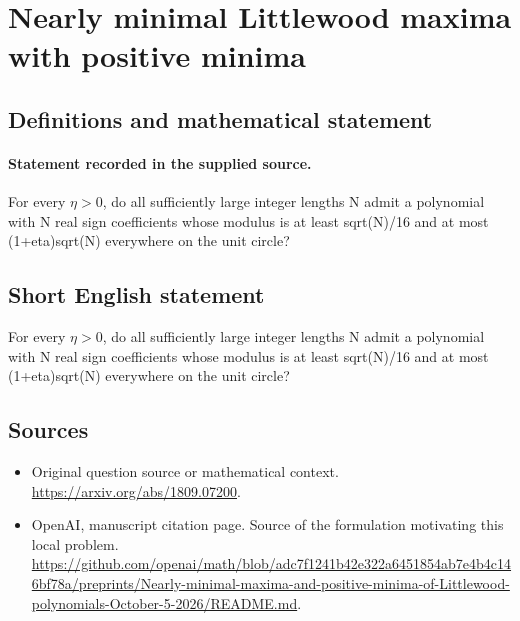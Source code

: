 \documentclass[11pt]{article}
\begin{document}
\section*{Nearly minimal Littlewood maxima with positive minima}\label{statement}
\subsection{Definitions and mathematical statement}
\paragraph{Statement recorded in the supplied source.}
For every $\eta >0$, do all sufficiently large integer lengths N admit a polynomial with N real sign coefficients whose modulus is at least sqrt(N)/16 and at most (1+eta)sqrt(N) everywhere on the unit circle?
\subsection{Short English statement}
For every $\eta >0$, do all sufficiently large integer lengths N admit a polynomial with N real sign coefficients whose modulus is at least sqrt(N)/16 and at most (1+eta)sqrt(N) everywhere on the unit circle?
\subsection{Sources}
\begin{itemize}
\item[S1] Original question source or mathematical context.
\url{https://arxiv.org/abs/1809.07200}.
\item[S2] OpenAI, manuscript citation page. Source of the formulation motivating this local problem.
\url{https://github.com/openai/math/blob/adc7f1241b42e322a6451854ab7e4b4c146bf78a/preprints/Nearly-minimal-maxima-and-positive-minima-of-Littlewood-polynomials-October-5-2026/README.md}.
\end{itemize}
\end{document}
